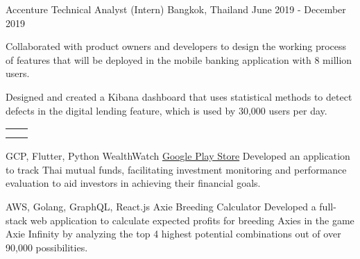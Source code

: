 \documentclass[]{awesome-cv}
\begin{document}
\begin{cventries}
{\begin{cvitems}
		\end{cvitems}}
	\cventry
	{Accenture}
	{Technical Analyst (Intern)}
	{Bangkok, Thailand}
	{June 2019 - December 2019}
	{\begin{cvitems}
			\item {Collaborated with product owners and developers to design the working process\\ of features that will be deployed in the mobile banking application with 8 million users.}
			\item {Designed and created a Kibana dashboard that uses statistical methods to detect\\ defects in the digital lending feature, which is used by 30,000 users per day.}
		\end{cvitems}}
\end{cventries}

\vspace{-5mm}
\begin{cvskills}
	\cvskill
	{{\begin{tabular}{ L{2.5cm} l }
		 & {} \\
		   & {}                      						    \\
	\end{tabular}}}
\end{cvskills}

\vspace{-9mm}
\begin{cventries}
	\cventry
	{GCP, Flutter, Python}
	{WealthWatch}
	{\href{https://play.google.com/store/apps/details?id=com.wealthwatch.portfolioapp}{Google Play Store}}
	{}
	{Developed an application to track Thai mutual funds, facilitating investment monitoring and performance evaluation to aid investors in achieving their financial goals.}
\end{cventries}
\begin{cventries}
	\cventry
	{AWS, Golang, GraphQL, React.js}
	{Axie Breeding Calculator}
	{}
	{}
	{Developed a full-stack web application to calculate expected profits for breeding Axies in the game Axie Infinity by analyzing the top 4 highest potential combinations out of over 90,000 possibilities.}
\end{cventries}
\end{document}
